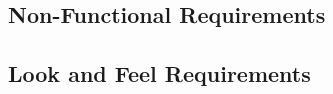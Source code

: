 \documentclass[]{article}
\begin{document}
\begin{enumerate}[{\bf BE1.}]


\section{Non-Functional Requirements}
\label{sec:non-functional_requirements}


\subsection{Look and Feel Requirements}
\label{sub:look_and_feel_requirements}



\end{enumerate}
\end{document}
